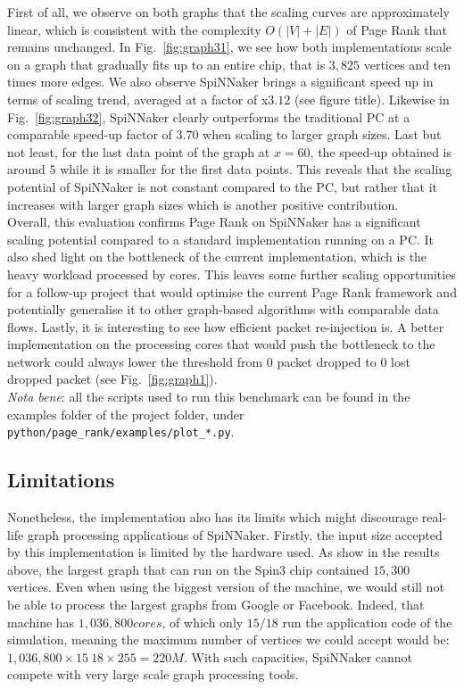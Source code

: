First of all, we observe on both graphs that the scaling curves are approximately linear, which is consistent with the complexity $O(|V|+|E|)$ of Page Rank that remains unchanged. In Fig.~\ref{fig:graph31}, we see how both implementations scale on a graph that gradually fits up to an entire chip, that is $3,825$ vertices and ten times more edges. We also observe SpiNNaker brings a significant speed up in terms of scaling trend, averaged at a factor of x$3.12$ (see figure title). Likewise in Fig.~\ref{fig:graph32}, SpiNNaker clearly outperforms the traditional PC at a comparable speed-up factor of $3.70$ when scaling to larger graph sizes. Last but not least, for the last data point of the graph at $x=60$, the speed-up obtained is around $5$ while it is smaller for the first data points. This reveals that the scaling potential of SpiNNaker is not constant compared to the PC, but rather that it increases with larger graph sizes which is another positive contribution. \\

Overall, this evaluation confirms Page Rank on SpiNNaker has a significant scaling potential compared to a standard implementation running on a PC. It also shed light on the bottleneck of the current implementation, which is the heavy workload processed by cores. This leaves some further scaling opportunities for a follow-up project that would optimise the current Page Rank framework and potentially generalise it to other graph-based algorithms with comparable data flows. Lastly, it is interesting to see how efficient packet re-injection is. A better implementation on the processing cores that would push the bottleneck to the network could always lower the threshold from 0 packet dropped to 0 lost dropped packet (see Fig.~\ref{fig:graph1}). \\

\textit{Nota bene}: all the scripts used to run this benchmark can be found in the examples folder of the project folder, under \texttt{python/page\_rank/examples/plot\_*.py}.

\subsection{Limitations} \label{sec:lim}

Nonetheless, the implementation also has its limits which might discourage real-life graph processing applications of SpiNNaker. Firstly, the input size accepted by this implementation is limited by the hardware used. As show in the results above, the largest graph that can run on the Spin3 chip contained $15,300$ vertices. Even when using the biggest version of the machine, we would still not be able to process the largest graphs from Google or Facebook. Indeed, that machine has $1,036,800 cores$, of which only $15/18$ run the application code of the simulation, meaning the maximum number of vertices we could accept would be: $1,036,800 \times 15 \ 18 \times 255 = 220M$. With such capacities, SpiNNaker cannot compete with very large scale graph processing tools. \\

